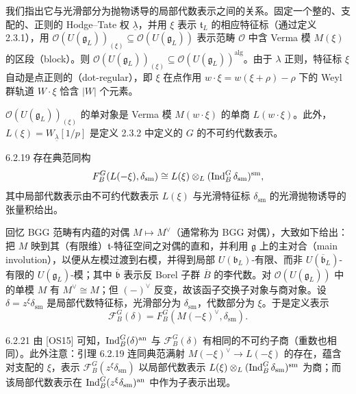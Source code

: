 我们指出它与光滑部分为抛物诱导的局部代数表示之间的关系。固定一个整的、支配的、正则的 Hodge--Tate 权 $\underline\lambda$，并用 $\xi$ 表示 $\mathfrak t_L$ 的相应特征标（通过定义 2.3.1），用 $\mathcal O(U(\mathfrak g_L))_{(\xi)}\subseteq\mathcal O(U(\mathfrak g_L))$ 表示范畴 $\mathcal O$ 中含 Verma 模 $M(\xi)$ 的区段（block）。则 $\mathcal O(U(\mathfrak g_L))_{(\xi)}\subseteq\mathcal O(U(\mathfrak g_L))^{\mathrm{alg}}$。由于 $\lambda$ 正则，特征标 $\xi$ 自动是点正则的（dot-regular），即 $\xi$ 在点作用 $w\cdot\xi=w(\xi+\rho)-\rho$ 下的 Weyl 群轨道 $W\cdot\xi$ 恰含 $|W|$ 个元素。

$\mathcal O(U(\mathfrak g_L))_{(\xi)}$ 的单对象是 Verma 模 $M(w\cdot\xi)$ 的单商 $L(w\cdot\xi)$。此外，$L(\xi)=W_{\underline\lambda}[1/p]$ 是定义 2.3.2 中定义的 $G$ 的不可约代数表示。

\begin{lem}{6.2.19}\label{lem:a4-6-2-19}
存在典范同构
\[
F_B^G(L(-\xi),\delta_{\mathrm{sm}})\cong L(\xi)\otimes_L(\operatorname{Ind}_B^G\delta_{\mathrm{sm}})^{\mathrm{sm}},
\]
其中局部代数表示由不可约代数表示 $L(\xi)$ 与光滑特征标 $\delta_{\mathrm{sm}}$ 的光滑抛物诱导的张量积给出。
\end{lem}

回忆 BGG 范畴有内蕴的对偶 $M\mapsto M^\vee$（通常称为 BGG 对偶），大致如下给出：把 $M$ 映到其（有限维）$\mathfrak t$-特征空间之对偶的直和，并利用 $\mathfrak g$ 上的主对合（main involution），以便从左模过渡到右模，并得到局部 $U(\mathfrak b_L)$-有限、而非 $U(\overline{\mathfrak b}_L)$-有限的 $U(\mathfrak g_L)$-模；其中 $\overline{\mathfrak b}$ 表示反 Borel 子群 $\overline{B}$ 的李代数。对 $\mathcal O(U(\mathfrak g_L))$ 中的单模 $M$ 有 $M^\vee\cong M$；但 $(-)^\vee$ 反变，故该函子交换子对象与商对象。设 $\delta=z^\xi\delta_{\mathrm{sm}}$ 是局部代数特征标，光滑部分为 $\delta_{\mathrm{sm}}$，代数部分为 $\xi$。于是定义表示
\begin{equation}\tag{6.2.20}\label{eq:a4-6-2-20}
\mathcal F_B^G(\delta)=F_B^G(M(-\xi)^\vee,\delta_{\mathrm{sm}}).
\end{equation}

\begin{rem}{6.2.21}\label{rem:a4-6-2-21}
由 [OS15] 可知，$\operatorname{Ind}_B^G(\delta)^{\mathrm{an}}$ 与 $\mathcal F_B^G(\delta)$ 有相同的不可约子商（重数也相同）。此外注意：引理 6.2.19 连同典范满射 $M(-\xi)^\vee\to L(-\xi)$ 的存在，蕴含对支配的 $\xi$，表示 $\mathcal F_B^G(z^\xi\delta_{\mathrm{sm}})$ 以局部代数表示 $L(\xi)\otimes_L(\operatorname{Ind}_B^G\delta_{\mathrm{sm}})^{\mathrm{sm}}$ 为商；而该局部代数表示在 $\operatorname{Ind}_B^G(z^\xi\delta_{\mathrm{sm}})^{\mathrm{an}}$ 中作为子表示出现。
\end{rem}

